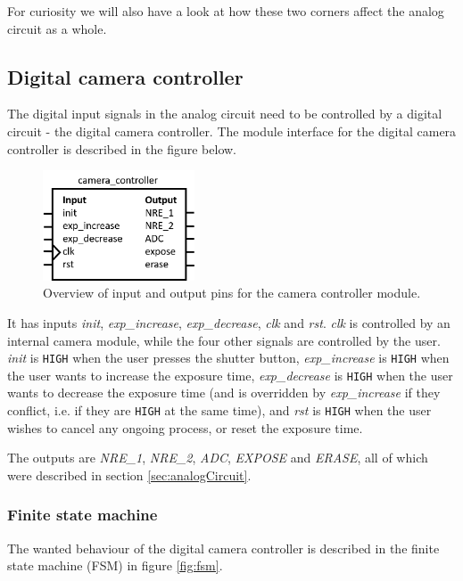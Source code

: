 For curiosity we will also have a look at how these two corners affect the analog circuit as a whole.

\subsection{Digital camera controller}
The digital input signals in the analog circuit need to be controlled by a digital circuit - the digital camera controller. The module interface for the digital camera controller is described in the figure below.

\begin{figure}[H]
    \centering
    \includegraphics[width=0.4\textwidth]{graphs/camera_controller_pinout.png}
    \caption{Overview of input and output pins for the camera controller module.}
    \label{fig:io}
\end{figure}

It has inputs \emph{init}, \emph{exp\_increase}, \emph{exp\_decrease}, \emph{clk} and \emph{rst}. \emph{clk} is controlled by an internal camera module, while the four other signals are controlled by the user. \emph{init} is \verb|HIGH| when the user presses the shutter button, \emph{exp\_increase} is \verb|HIGH| when the user wants to increase the exposure time, \emph{exp\_decrease} is \verb|HIGH| when the user wants to decrease the exposure time (and is overridden by \emph{exp\_increase} if they conflict, i.e. if they are \verb|HIGH| at the same time), and \emph{rst} is \verb|HIGH| when the user wishes to cancel any ongoing process, or reset the exposure time.

The outputs are \emph{NRE\_1}, \emph{NRE\_2}, \emph{ADC}, \emph{EXPOSE} and \emph{ERASE}, all of which were described in section \ref{sec:analogCircuit}.

\subsubsection{Finite state machine}
\label{sec:fsm}
The wanted behaviour of the digital camera controller is described in the finite state machine (FSM) in figure \ref{fig:fsm}.

